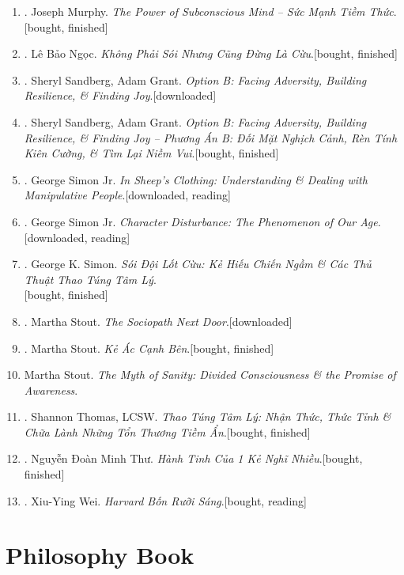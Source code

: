 \documentclass{article}
\begin{document}
\begin{enumerate}
	\item \cite{Murphy2021}. Joseph Murphy. \textit{The Power of Subconscious Mind -- Sức Mạnh Tiềm Thức}.\hfill\textsf{[bought, finished]}
	\item \cite{Ngoc2022}. Lê Bảo Ngọc. \textit{Không Phải Sói Nhưng Cũng Đừng Là Cừu}.\hfill\textsf{[bought, finished]}
	\item \cite{Sandberg_Grant2017}. Sheryl Sandberg, Adam Grant. \textit{Option B: Facing Adversity, Building Resilience, \& Finding Joy}.\hfill\textsf{[downloaded]}
	\item \cite{Sandberg_Grant2019}. Sheryl Sandberg, Adam Grant. \textit{Option B: Facing Adversity, Building Resilience, \& Finding Joy -- Phương Án B: Đối Mặt Nghịch Cảnh, Rèn Tính Kiên Cường, \& Tìm Lại Niềm Vui}.\hfill\textsf{[bought, finished]}
	\item \cite{Simon2010}. George Simon Jr. \textit{In Sheep's Clothing: Understanding \& Dealing with Manipulative People}.\hfill\textsf{[downloaded, reading]}
	\item \cite{Simon2011}. George Simon Jr. \textit{Character Disturbance: The Phenomenon of Our Age}.\hfill\textsf{[downloaded, reading]}
	\item \cite{Simon2022}. George K. Simon. \textit{Sói Đội Lốt Cừu: Kẻ Hiếu Chiến Ngầm \& Các Thủ Thuật Thao Túng Tâm Lý}.\\\mbox{}\hfill\textsf{[bought, finished]}
	\item \cite{Stout2006}. Martha Stout. \textit{The Sociopath Next Door}.\hfill\textsf{[downloaded]}
	\item \cite{Stout2019}. Martha Stout. \textit{Kẻ Ác Cạnh Bên}.\hfill\textsf{[bought, finished]}	
	\item Martha Stout. \textit{The Myth of Sanity: Divided Consciousness \& the Promise of Awareness}.	
	\item \cite{Thomas2021}. Shannon Thomas, LCSW. \textit{Thao Túng Tâm Lý: Nhận Thức, Thức Tỉnh \& Chữa Lành Những Tổn Thương Tiềm Ẩn}.\hfill\textsf{[bought, finished]}
	\item \cite{Thu2022}. Nguyễn Đoàn Minh Thư. \textit{Hành Tinh Của 1  Kẻ Nghĩ Nhiều}.\hfill\textsf{[bought, finished]}
	\item \cite{Wei2022}. Xiu-Ying Wei. \textit{Harvard Bốn Rưỡi Sáng}.\hfill\textsf{[bought, reading]}
\end{enumerate}


\section{Philosophy Book}
\end{document}
